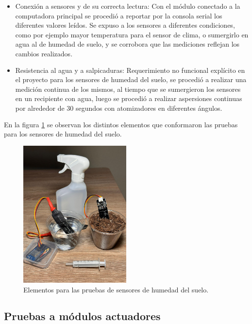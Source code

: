\begin{itemize}
\item Conexión a sensores y de su correcta lectura: Con el módulo conectado a la computadora principal se procedió a reportar por la consola serial los diferentes valores leídos. Se expuso a los sensores a diferentes condiciones, como por ejemplo mayor temperatura para el sensor de clima, o sumergirlo en agua al de humedad de suelo, y se corrobora que las mediciones reflejan los cambios realizados.
\item Resistencia al agua y a salpicaduras: Requerimiento no funcional explícito en el proyecto para los sensores de humedad del suelo, se procedió a realizar una medición continua de los mismos, al tiempo que se sumergieron los sensores en un recipiente con agua, luego se procedió a realizar aspersiones continuas por alrededor de 30 segundos con  atomizadores en diferentes ángulos. 
\end{itemize}
En la figura \ref{fig:soil_test} se observan los distintos elementos que conformaron las pruebas para los sensores de humedad del suelo.

\begin{figure}[h]
	\centering
	\includegraphics[width=0.50\textwidth]{./Figures/chapter4/soil_testing.jpg}
	\caption[Elementos para las pruebas de sensores de humedad del suelo]{Elementos para las pruebas de sensores de humedad del suelo.}
	\label{fig:soil_test}
\end{figure}

\subsection{Pruebas a módulos actuadores}
\label{sec:Pruebas a módulos actuadores}



